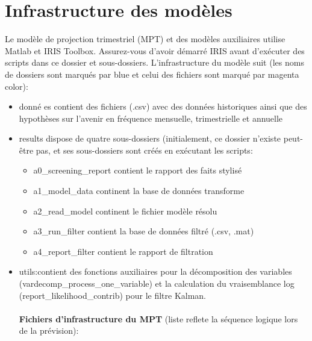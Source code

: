 \section{Infrastructure des modèles}
 \justifying \large Le modèle de projection trimestriel (MPT) et des modèles auxiliaires utilise Matlab et IRIS Toolbox. Assurez-vous d'avoir d\'{e}marr\'{e} IRIS avant d'ex\'{e}cuter des scripts dans ce dossier et sous-dossiers. L’infrastructure du modèle suit (les noms de dossiers sont marqu\'{e}s par {\color{blue}blue} et celui des fichiers sont marqu\'{e} par {\color{magenta}magenta color}):
    \renewcommand{\labelitemi}{$\circ$}
    \begin{itemize}
        \item {\color{blue}donn\'{e} es} contient des fichiers (.csv) avec des données historiques ainsi que des hypothèses sur l'avenir en fr\'{e}quence mensuelle, trimestrielle et annuelle 
        \item {\color{blue}results} dispose de quatre sous-dossiers (initialement, ce dossier n’existe peut-être pas, et ses sous-dossiers sont créés en exécutant les scripts:
        \begin{itemize}
			\item {\color{blue}a0\_screening\_report} contient le rapport des faits stylisé            
            \item {\color{blue}a1\_model\_data} continent la base de données transforme
            \item {\color{blue}a2\_read\_model} continent le fichier modèle résolu
            \item {\color{blue}a3\_run\_filter} contient la base de données filtré (.csv, .mat)
            \item {\color{blue}a4\_report\_filter} contient le rapport de filtration
        \end{itemize}
        \item {\color{blue}utils}:contient des fonctions auxiliaires pour la décomposition des variables (vardecomp\_process\_one\_variable) et la calculation du vraisemblance log (report\_likelihood\_contrib) pour le filtre Kalman. \\\\
            {\bf Fichiers d'infrastructure  du MPT} (liste reflete la séquence logique lors de la prévision):

\end{itemize}
